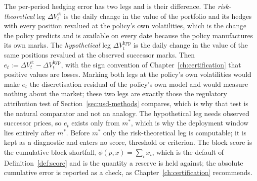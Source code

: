 \documentclass[../../../main.tex]{subfiles}
\begin{document}
The per-period hedging error has two legs and is their difference. The \emph{risk-theoretical} leg $\Delta V^{\mathrm{rt}}_t$ is the daily change in the value of the portfolio and its hedges with every position revalued at the policy's own volatilities, which is the change the policy predicts and is available on every date because the policy manufactures its own marks. The \emph{hypothetical} leg $\Delta V^{\mathrm{hyp}}_t$ is the daily change in the value of the same positions revalued at the observed successor marks. Then $e_t:=\Delta V^{\mathrm{rt}}_t-\Delta V^{\mathrm{hyp}}_t$, with the sign convention of Chapter~\ref{ch:certification} that positive values are losses. Marking both legs at the policy's own volatilities would make $e_t$ the discretisation residual of the policy's own model and would measure nothing about the market; these two legs are exactly those the regulatory attribution test of Section~\ref{sec:usd-methods} compares, which is why that test is the natural comparator and not an analogy. The hypothetical leg needs observed successor prices, so $e_t$ exists only from $m^*$, which is why the deployment window lies entirely after $m^*$. Before $m^*$ only the risk-theoretical leg is computable; it is kept as a diagnostic and enters no score, threshold or criterion. The block score is the cumulative block shortfall, $\phi(p,x)=\sum_i x_i$, which is the default of Definition~\ref{def:score} and is the quantity a reserve is held against; the absolute cumulative error is reported as a check, as Chapter~\ref{ch:certification} recommends.


\end{document}
